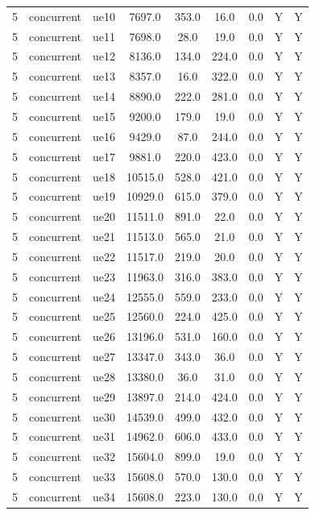 \begin{table}[ht]
\begin{tabular}{|c|c|c|c|c|c|c|c|c|}
5 & concurrent & ue10 & 7697.0 & 353.0 & 16.0 & 0.0 & Y & Y \\
5 & concurrent & ue11 & 7698.0 & 28.0 & 19.0 & 0.0 & Y & Y \\
5 & concurrent & ue12 & 8136.0 & 134.0 & 224.0 & 0.0 & Y & Y \\
5 & concurrent & ue13 & 8357.0 & 16.0 & 322.0 & 0.0 & Y & Y \\
5 & concurrent & ue14 & 8890.0 & 222.0 & 281.0 & 0.0 & Y & Y \\
5 & concurrent & ue15 & 9200.0 & 179.0 & 19.0 & 0.0 & Y & Y \\
5 & concurrent & ue16 & 9429.0 & 87.0 & 244.0 & 0.0 & Y & Y \\
5 & concurrent & ue17 & 9881.0 & 220.0 & 423.0 & 0.0 & Y & Y \\
5 & concurrent & ue18 & 10515.0 & 528.0 & 421.0 & 0.0 & Y & Y \\
5 & concurrent & ue19 & 10929.0 & 615.0 & 379.0 & 0.0 & Y & Y \\
5 & concurrent & ue20 & 11511.0 & 891.0 & 22.0 & 0.0 & Y & Y \\
5 & concurrent & ue21 & 11513.0 & 565.0 & 21.0 & 0.0 & Y & Y \\
5 & concurrent & ue22 & 11517.0 & 219.0 & 20.0 & 0.0 & Y & Y \\
5 & concurrent & ue23 & 11963.0 & 316.0 & 383.0 & 0.0 & Y & Y \\
5 & concurrent & ue24 & 12555.0 & 559.0 & 233.0 & 0.0 & Y & Y \\
5 & concurrent & ue25 & 12560.0 & 224.0 & 425.0 & 0.0 & Y & Y \\
5 & concurrent & ue26 & 13196.0 & 531.0 & 160.0 & 0.0 & Y & Y \\
5 & concurrent & ue27 & 13347.0 & 343.0 & 36.0 & 0.0 & Y & Y \\
5 & concurrent & ue28 & 13380.0 & 36.0 & 31.0 & 0.0 & Y & Y \\
5 & concurrent & ue29 & 13897.0 & 214.0 & 424.0 & 0.0 & Y & Y \\
5 & concurrent & ue30 & 14539.0 & 499.0 & 432.0 & 0.0 & Y & Y \\
5 & concurrent & ue31 & 14962.0 & 606.0 & 433.0 & 0.0 & Y & Y \\
5 & concurrent & ue32 & 15604.0 & 899.0 & 19.0 & 0.0 & Y & Y \\
5 & concurrent & ue33 & 15608.0 & 570.0 & 130.0 & 0.0 & Y & Y \\
5 & concurrent & ue34 & 15608.0 & 223.0 & 130.0 & 0.0 & Y & Y \\

\end{tabular}
\end{table}
